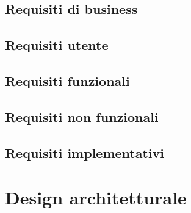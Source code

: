         \section{Requisiti di business}\label{sec:requirements:businee}
            
        \section{Requisiti utente}\label{sec:requirements:user}
            
        \section{Requisiti funzionali}\label{sec:requirements:functional}
            
        \section{Requisiti non funzionali}\label{sec:requirements:notfunctional}
           	
        \section{Requisiti implementativi}\label{sec:requirements:implementative}
            

    \clearpage

    \chapter{Design architetturale}\label{ch:design}
        

